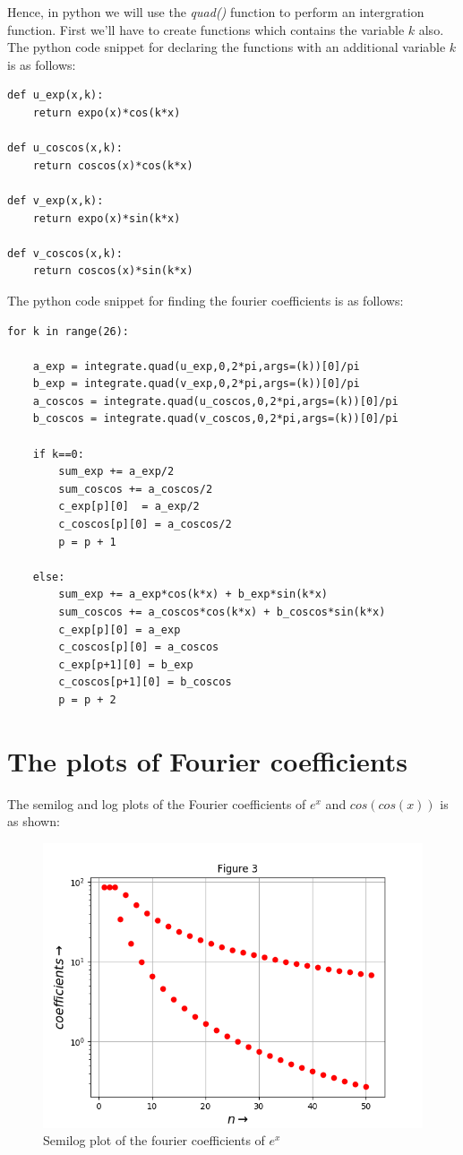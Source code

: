 \documentclass[11pt, a4paper]{article}
\begin{document}
Hence, in python we will use the \textit{quad()} function to perform an intergration function. First we'll have to create functions which contains the variable $k$ also. The python code snippet for declaring the functions with an additional variable $k$ is as follows:
\begin{verbatim}
def u_exp(x,k):
	return expo(x)*cos(k*x)

def u_coscos(x,k):
	return coscos(x)*cos(k*x)	

def v_exp(x,k):
	return expo(x)*sin(k*x)

def v_coscos(x,k):
	return coscos(x)*sin(k*x)	

\end{verbatim}
The python code snippet for finding the fourier coefficients is as follows:
\begin{verbatim}
for k in range(26):
	
    a_exp = integrate.quad(u_exp,0,2*pi,args=(k))[0]/pi
    b_exp = integrate.quad(v_exp,0,2*pi,args=(k))[0]/pi
    a_coscos = integrate.quad(u_coscos,0,2*pi,args=(k))[0]/pi
    b_coscos = integrate.quad(v_coscos,0,2*pi,args=(k))[0]/pi

    if k==0:
        sum_exp += a_exp/2
        sum_coscos += a_coscos/2
        c_exp[p][0]  = a_exp/2
        c_coscos[p][0] = a_coscos/2 
        p = p + 1

    else:
        sum_exp += a_exp*cos(k*x) + b_exp*sin(k*x)	
        sum_coscos += a_coscos*cos(k*x) + b_coscos*sin(k*x)	
        c_exp[p][0] = a_exp
        c_coscos[p][0] = a_coscos
        c_exp[p+1][0] = b_exp
        c_coscos[p+1][0] = b_coscos
        p = p + 2
\end{verbatim}
   
\section{The plots of Fourier coefficients}
The semilog and log plots of the Fourier coefficients of  $e^{x}$ and $cos(cos(x))$ is as shown:
	\begin{figure}[!tbh]
   	\centering
   	\includegraphics[scale=0.6]{Figure_3.png}   
   	\caption{Semilog plot of the fourier coefficients of $e^{x}$}
   	\label{fig:sample}
   \end{figure} 
\end{document}
